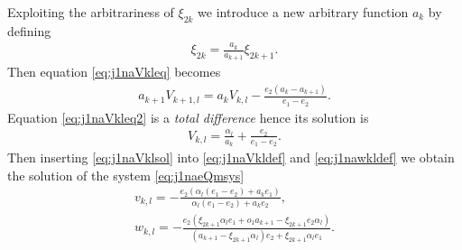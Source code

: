 \documentclass[pdftex]{sigma}
\numberwithin{equation}{section}
\begin{document}
 Exploiting the arbitrariness of $\xi_{2k}$ we introduce a new arbitrary function $a_{k}$ by def\/ining
 \begin{gather}
 \xi_{{2 k}}={\frac {a_{{k}}}{a_{{k+1}}}}\xi_{{2 k+1}}. \label{eq:j1nalkdef}
 \end{gather}
 Then equation \eqref{eq:j1naVkleq} becomes
 \begin{gather}
 a_{{k+1}}V_{{k+1,l}} =a_{{k}}V_{{k,l}} -{\frac {{ e_2} ( a_{{k}}-a_{{k+1}} ) }{{ e_1} -{ e_2}}}. \label{eq:j1naVkleq2}
 \end{gather}
 Equation \eqref{eq:j1naVkleq2} is a \emph{total difference} hence its solution is
 \begin{gather}
 V_{{k,l}}={\frac {\alpha_{{l}}}{a_{{k}}}} +{\frac {{ e_2}}{{ e_1}-{ e_2}}}. \label{eq:j1naVklsol}
 \end{gather}
 Then inserting \eqref{eq:j1naVklsol} into \eqref{eq:j1naVkldef} and \eqref{eq:j1nawkldef} we obtain the solution of the system \eqref{eq:j1naeQmsys}
 \begin{subequations} \label{eq:j1naeQmsol}
 \begin{gather}
 v_{{k,l}} =-{\frac {{ e_2} ( \alpha_{{l}}
 ( { e_1}-{ e_2} ) +a_{{k}}{ e_1} ) }{
 \alpha_{{l}} ( { e_1}-{ e_2} ) +a_{{k}}{ e_2}}}, \label{eq:j1nawklsol} \\
 w_{{k,l}}=-{\frac {{ e_2} ( \xi_{{2 k+1}}\alpha_{{l}}{ e_1}+{ o_1} a_{{k+1}}
 -\xi_{{2 k+1}}{ e_2} \alpha_{{l}} ) }{ ( a_{{k+1}}-\xi_{{2 k+1}}\alpha_{{l}} )
 { e_2}+\xi_{{2 k+1}} \alpha_{{l}}{ e_1}}}. \label{eq:j1nawklsol2}
 \end{gather}
 \end{subequations}
\end{document}
